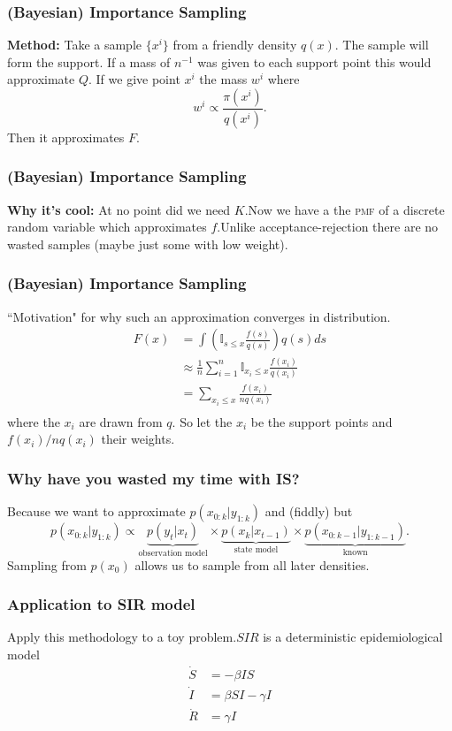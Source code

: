 \documentclass{beamer}
\begin{document}
\frame
{
\frametitle{(Bayesian) Importance Sampling}
\textbf{Method:} Take a sample $\{x^i\}$ from a friendly density $q(x)$. The sample will form the support. If a mass of $n^{-1}$ was given to each support point this would approximate $Q$. If we give point $x^i$ the mass $w^i$ where
\begin{equation}
w^i\propto \frac{\pi(x^i)}{q(x^i)}.
\end{equation}
Then it approximates $F$.
}

\frame
{
\frametitle{(Bayesian) Importance Sampling}
\textbf{Why it's cool:} At no point did we need $K$.\newline\newline Now we have a the \textsc{pmf} of a discrete random variable which approximates $f$.\newline\newline Unlike acceptance-rejection there are no wasted samples (maybe just some with low weight).
}

\frame
{
\frametitle{(Bayesian) Importance Sampling}
``Motivation" for why such an approximation converges in distribution.
\begin{equation}
\begin{aligned}
F(x)&= \int\left( \mathbb{I}_{s\leq x}\frac{f(s)}{q(s)}\right)q(s)ds\\
&\approx \frac{1}{n}\sum_{i=1}^n  \mathbb{I}_{x_i\leq x}\frac{f(x_i)}{q(x_i)}\\
&= \sum_{x_i\leq x}\frac{f(x_i)}{nq(x_i)}\\
\end{aligned}
\end{equation}
where the $x_i$ are drawn from $q$. So let the $x_i$ be the support points and $f(x_i)/n q(x_i)$ their weights.
}

\frame
{
\frametitle{Why have you wasted my time with IS?}
Because we want to approximate $p(x_{0:k}|y_{1:k})$ and (fiddly) but
\begin{equation}
p(x_{0:k}|y_{1:k})\propto \underbrace{p(y_t|x_t)}_{\text{observation model}}\times\underbrace{p(x_k|x_{t-1})}_{\text{state model}}\times\underbrace{p(x_{0:k-1}|y_{1:k-1})}_{\text{known}}.
\end{equation}
Sampling from $p(x_0)$ allows us to sample from all later densities.
}

\frame
{
\frametitle{Application to SIR model}
Apply this methodology to a toy problem.\newline\newline $SIR$ is a deterministic epidemiological model
\begin{equation}
\begin{aligned}
\dot{S} &= -\beta IS\\
\dot{I} &= \beta SI - \gamma I\\
\dot{R} &= \gamma I
\end{aligned}
\end{equation}
}
\end{document}
